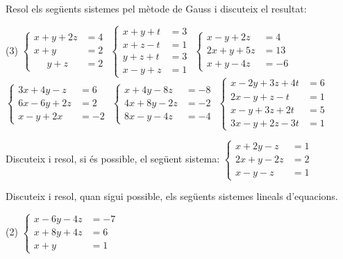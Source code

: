 \begin{mylist}
\exer  Resol els següents sistemes pel mètode de Gauss i discuteix el resultat:
 \begin{tasks}(3)
\task $\left\{\begin{array}{ll} x+y+2z&=4 \\ x+y&=2 \\ \quad \,\, y+z&=2 \end{array}\right. $   
\task $\left\{\begin{array}{rl} x+y+t&=3 \\ x+z-t&=1 \\ y+z+t&=3 \\ x-y+z&=1 \end{array}\right. $   
 \task $\left\{\begin{array}{rl} x-y+2z&=4 \\ 2x+y+5z&=13 \\ x+y-4z&=-6 \end{array}\right. $ 
\task $\left\{\begin{array}{rl} 3x+4y-z&=6 \\ 6x-6y+2z&=2 \\ x-y+2x&=-2 \end{array}\right. $   
\task $\left\{\begin{array}{rl} x+4y-8z&=-8 \\ 4x+8y-2z&=-2 \\ 8x-y-4z&=-4 \end{array}\right. $   
\task $\left\{\begin{array}{rl} x-2y+3z+4t&=6 \\ 2x-y+z-t&=1 \\ x-y+3z+2t&=5 \\ 3x-y+2z-3t&=1 \end{array}\right. $
  \end{tasks}
\answers[cols=1]{[
	$x=1; y=1; z=1$, 
	$x=1; y=1; z=1; t=1$, 
	$x=1; y=1; z=2$, 
	$x=\dfrac{5}{9}; y=\dfrac{11}{3}; z=\dfrac{31}{3}$, 
	$x=0; y=0; z=1$, 
	$x=1; y=1; z=1; t=1$
	]}

	\exer  Discuteix i resol, si és possible, el següent sistema:
	$\left\{\begin{array}{ll} x+2y-z&=1 \\ 2x+y-2z&=2 \\ x-y-z&=1 \end{array}\right.$ 
	
	\exer  Discuteix i resol, quan sigui possible, els següents sistemes  lineals d'equacions.
   \begin{tasks}(2)
	\task $\left\{\begin{array}{ll} x-6y-4z&=-7 \\ x+8y+4z&=6 \\  x+y&=1 \end{array}\right.$
	

\end{tasks}
\end{mylist}
